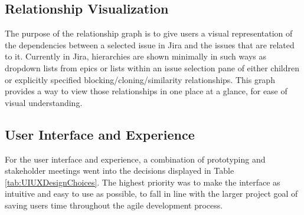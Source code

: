 \subsection{Relationship Visualization}
The purpose of the relationship graph is to give users a visual representation of the dependencies between a selected issue in Jira and the issues that are related to it. Currently in Jira, hierarchies are shown minimally in such ways as dropdown lists from epics or lists within an issue selection pane of either children or explicitly specified blocking/cloning/similarity relationships. This graph provides a way to view those relationships in one place at a glance, for ease of visual understanding.

\subsection{User Interface and Experience}
For the user interface and experience, a combination of prototyping and stakeholder meetings went into the decisions displayed in Table \ref{tab:UIUXDesignChoices}. The highest priority was to make the interface as intuitive and easy to use as possible, to fall in line with the larger project goal of saving users time throughout the agile development process.
